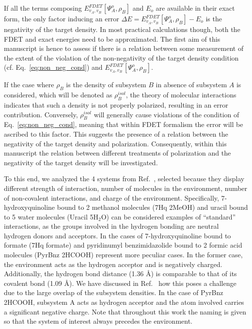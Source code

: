 \documentclass[journal=jctcce,manuscript=article, layout=twocolumn]{achemso}
\begin{document}
If all the terms composing $E_{v_A,v_B}^{FDET}[\Psi^{o}_{A},\rho_B]$ and $E_o$ are available in their exact form, the only factor inducing an error $\Delta E = E_{v_A,v_B}^{FDET}[\Psi^{o}_{A},\rho_B] - E_o$ is the negativity of the target density. In most practical calculations though, both the FDET and exact energies need to be approximated.
The first aim of this manuscript is hence to assess if there is a relation between some measurement of the extent of the violation of the non-negativity of the target density condition (cf. Eq.~\ref{eq:non_neg_cond}) and ${E}_{v_A,v_B}^{FDET}[\Psi^{o}_{A},\rho_B]$.


If the case where $\rho_B$ is the density of subsystem $B$ in absence of subsystem $A$ is considered, which will be denoted as $\rho_B^{isol}$, the theory of molecular interactions indicates that such a density is not properly polarized, resulting in an error contribution. Conversely, $\rho_B^{isol}$ will generally cause violations of the condition of Eq.~\ref{eq:non_neg_cond}, meaning that within FDET formalism the error will be ascribed to this factor. This suggests the presence of a relation between the negativity of the target density and polarization.
Consequently, within this manuscript the relation between different treatments of polarization and the negativity of the target density will be investigated.

To this end, we analyzed the 4 systems from Ref.~, selected because they display different strength of interaction, number of molecules in the environment, number of non-covalent interactions, and charge of the environment.
Specifically, 7-hydroxyquinoline bound to 2 methanol molecules (7Hq 2MeOH) and uracil bound to 5 water molecules (Uracil 5H$_2$O) can be considered examples of ``standard'' interactions, as the groups involved in the hydrogen bonding are neutral hydrogen donors and acceptors. In the cases of 7-hydroxyquinoline bound to formate (7Hq formate) and pyridinumyl benzimidazolide bound to 2 formic acid molecules (PyrBnz 2HCOOH) represent more peculiar cases. In the former case, the environment acts as the hydrogen acceptor and is negatively charged. Additionally, the hydrogen bond distance (1.36 \AA) is comparable to that of its covalent bond (1.09 \AA). We have discussed in Ref.~ how this poses a challenge due to the large overlap of the subsystem densities. In the case of PyrBnz 2HCOOH, subsystem A acts as hydrogen acceptor and the atom involved carries a significant negative charge.
Note that throughout this work the naming is given so that the system of interest always precedes the environment.
\end{document}
